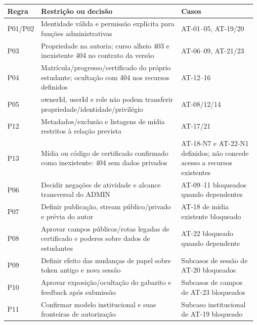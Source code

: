 {\def\LTcaptype{none} %
\begin{longtable}[]{@{}
  >{\raggedright\arraybackslash}p{}
  >{\raggedright\arraybackslash}p{}
  >{\raggedright\arraybackslash}p{}@{}}
\toprule\noalign{}
\begin{minipage}[b]{\linewidth}\raggedright
Regra
\end{minipage} & \begin{minipage}[b]{\linewidth}\raggedright
Restrição ou decisão
\end{minipage} & \begin{minipage}[b]{\linewidth}\raggedright
Casos
\end{minipage} \\
\midrule\noalign{}
\endhead
\bottomrule\noalign{}
\endlastfoot
P01/P02 & Identidade válida e permissão explícita para funções
administrativas & AT-01--05, AT-19/20 \\
P03 & Propriedade na autoria; curso alheio 403 e inexistente 404 no
contrato da versão & AT-06--09, AT-21/23 \\
P04 & Matrícula/\allowbreak{}progresso/\allowbreak{}certificado do próprio estudante; ocultação
com 404 nos recursos definidos & AT-12--16 \\
P05 & ownerId, userId e role não podem transferir
propriedade/\allowbreak{}identidade/\allowbreak{}privilégio & AT-08/12/14 \\
P12 & Metadados/\allowbreak{}exclusão e listagens de mídia restritos à relação
prevista & AT-17/21 \\
P13 & Mídia ou código de certificado confirmado como inexistente: 404
sem dados privados & AT-18-N7 e AT-22-N1 definidos; não concede acesso a
recursos existentes \\
P06 & Decidir negações de atividade e alcance transversal do ADMIN &
AT-09--11 bloqueados quando dependentes \\
P07 & Definir publicação, stream público/\allowbreak{}privado e prévia do autor &
AT-18 de mídia existente bloqueado \\
P08 & Aprovar campos públicos/\allowbreak{}rotas legadas de certificado e poderes
sobre dados de estudantes & AT-22 bloqueado quando dependente \\
P09 & Definir efeito das mudanças de papel sobre token antigo e nova
sessão & Subcasos de sessão de AT-20 bloqueados \\
P10 & Aprovar exposição/\allowbreak{}ocultação do gabarito e feedback após submissão
& Subcasos de campos de AT-23 bloqueados \\
P11 & Confirmar modelo institucional e suas fronteiras de autorização &
Subcaso institucional de AT-19 bloqueado \\
\end{longtable}
}

